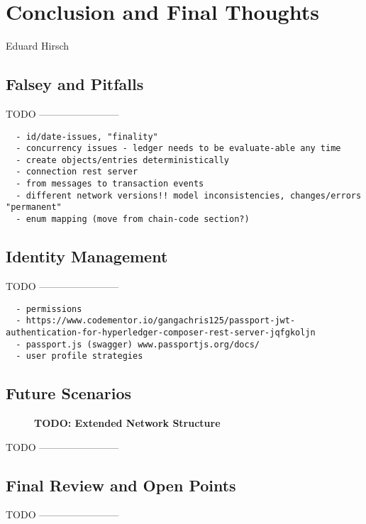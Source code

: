 \chapter{Conclusion and Final Thoughts}
\label{ch:conclusion}

\vspace{-1cm}
\begin{center}
Eduard Hirsch
\end{center}

\section{Falsey and Pitfalls}

TODO ------------------------

\begin{verbatim}
  - id/date-issues, "finality"
  - concurrency issues - ledger needs to be evaluate-able any time
  - create objects/entries deterministically
  - connection rest server
  - from messages to transaction events
  - different network versions!! model inconsistencies, changes/errors "permanent"
  - enum mapping (move from chain-code section?)
\end{verbatim}

\section{Identity Management}
\label{sec:id-management}

TODO ------------------------

\begin{verbatim}
  - permissions
  - https://www.codementor.io/gangachris125/passport-jwt-authentication-for-hyperledger-composer-rest-server-jqfgkoljn
  - passport.js (swagger) www.passportjs.org/docs/
  - user profile strategies
\end{verbatim}

\section{Future Scenarios}
\label{sec:future-scene}

\begin{figure}[htbp]
  \centering
  \caption{\bf\small TODO: Extended Network Structure}
  \label{fig:prototype-net-ext}
\end{figure}

TODO ------------------------

\section{Final Review and Open Points}

TODO ------------------------
